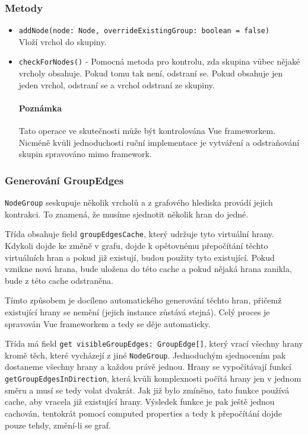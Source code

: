 \subsubsection*{Metody}
\begin{itemize}
  \item \texttt{addNode(node: Node, overrideExistingGroup: boolean = false)}\mbox{}\\Vloží vrchol do skupiny.
  \item \texttt{checkForNodes()} - Pomocná metoda pro kontrolu, zda skupina vůbec nějaké vrcholy obsahuje. Pokud tomu tak není, odstraní se. Pokud obsahuje jen jeden vrchol, odstraní se a vrchol odstraní ze skupiny.
  \paragraph{Poznámka} Tato operace ve skutečnosti může být kontrolována Vue frameworkem. Nicméně kvůli jednoduchosti ruční implementace je vytváření a odstraňování skupin spravováno mimo framework.
\end{itemize}

\subsubsection{Generování GroupEdges}
\texttt{NodeGroup} seskupuje několik vrcholů a z grafového hlediska provádí jejich kontrakci. To znamená, že musíme sjednotit několik hran do jedné.

Třída obsahuje field \texttt{groupEdgesCache}, který udržuje tyto virtuální hrany. Kdykoli dojde ke změně v grafu, dojde k opětovnému přepočítání těchto virtuálních hran a pokud již existují, budou použity tyto existující. Pokud vznikne nová hrana, bude uložena do této cache a pokud nějaká hrana zanikla, bude z této cache odstraněna.

Tímto způsobem je docíleno automatického generování těchto hran, přičemž existující hrany se nemění (jejich instance zůstává stejná). Celý proces je spravován Vue frameworkem a tedy se děje automaticky.

Třída má field \texttt{get visibleGroupEdges: GroupEdge[]}, který vrací všechny hrany kromě těch, které vycházejí z jiné \texttt{NodeGroup}. Jednoduchým sjednocením pak dostaneme všechny hrany a každou právě jednou. Hrany se vypočítávají funkcí \texttt{getGroupEdgesInDirection}, která kvůli komplexnosti počítá hrany jen v jednom směru a musí se tedy volat dvakrát. Jak již bylo zmíněno, tato funkce používá cache, aby vracela již existující hrany. Výsledek funkce je pak ještě jednou cachován, tentokrát pomocí computed properties a tedy k přepočítání dojde pouze tehdy, změní-li se graf.

